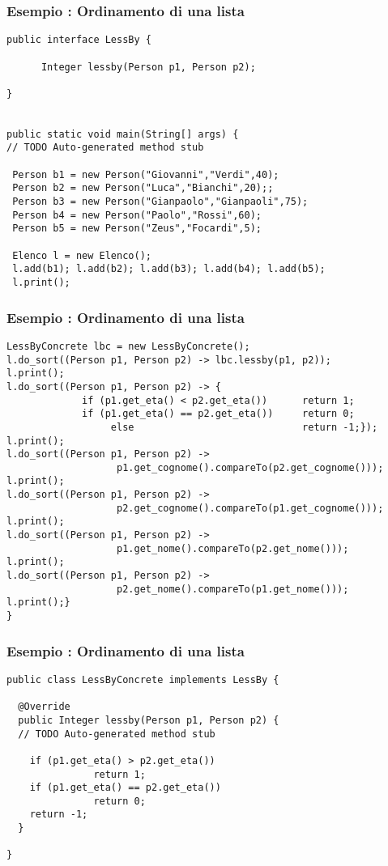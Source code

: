 \documentclass{beamer}
\begin{document}
\begin{frame}[fragile]
\frametitle{Esempio : Ordinamento di una lista}
\fontsize{12pt}{7.2}\selectfont
\begin{lstlisting}
public interface LessBy {
	
      Integer lessby(Person p1, Person p2);
      
}


public static void main(String[] args) {
// TODO Auto-generated method stub
		
 Person b1 = new Person("Giovanni","Verdi",40);
 Person b2 = new Person("Luca","Bianchi",20);;
 Person b3 = new Person("Gianpaolo","Gianpaoli",75);
 Person b4 = new Person("Paolo","Rossi",60);
 Person b5 = new Person("Zeus","Focardi",5);

 Elenco l = new Elenco();
 l.add(b1); l.add(b2); l.add(b3); l.add(b4); l.add(b5);
 l.print();
\end{lstlisting}
\end{frame}

\begin{frame}[fragile]
\frametitle{Esempio : Ordinamento di una lista}
\fontsize{12pt}{7.2}\selectfont
\begin{lstlisting}
LessByConcrete lbc = new LessByConcrete();
l.do_sort((Person p1, Person p2) -> lbc.lessby(p1, p2));
l.print();
l.do_sort((Person p1, Person p2) -> {
             if (p1.get_eta() < p2.get_eta())      return 1;
             if (p1.get_eta() == p2.get_eta())     return 0;
                  else                             return -1;});
l.print();
l.do_sort((Person p1, Person p2) ->
                   p1.get_cognome().compareTo(p2.get_cognome())); 	
l.print();
l.do_sort((Person p1, Person p2) ->
                   p2.get_cognome().compareTo(p1.get_cognome())); 
l.print();		
l.do_sort((Person p1, Person p2) ->
                   p1.get_nome().compareTo(p2.get_nome())); 		
l.print();
l.do_sort((Person p1, Person p2) ->
                   p2.get_nome().compareTo(p1.get_nome())); 
l.print();}
}
\end{lstlisting}
\end{frame}

\begin{frame}[fragile]
\frametitle{Esempio : Ordinamento di una lista}
\fontsize{12pt}{7.2}\selectfont
\begin{lstlisting}
public class LessByConcrete implements LessBy {

  @Override
  public Integer lessby(Person p1, Person p2) {
  // TODO Auto-generated method stub

    if (p1.get_eta() > p2.get_eta())
               return 1;
    if (p1.get_eta() == p2.get_eta())
               return 0;
    return -1;
  }

}

\end{lstlisting}
\end{frame}
\end{document}
